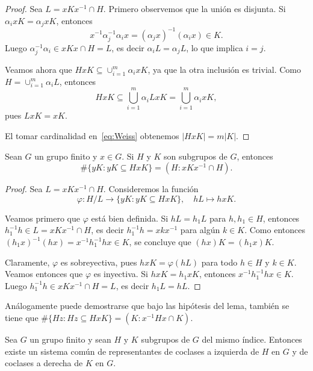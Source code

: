 \begin{proof}
    Sea $L=xKx^{-1}\cap H$. 
    Primero observemos que la unión es disjunta. Si $\alpha_ixK=\alpha_jxK$, entonces 
    \[
    x^{-1}\alpha_j^{-1}\alpha_ix=(\alpha_jx)^{-1}(\alpha_ix)\in K.
    \]
    Luego $\alpha_j^{-1}\alpha_i\in xKx\cap H=L$, es decir $\alpha_iL=\alpha_jL$, lo que implica $i=j$. 
    
    Veamos ahora
    que $HxK\subseteq\cup_{i=1}^m\alpha_ixK$, ya que la otra inclusión es trivial. 
    Como $H=\cup_{i=1}^m\alpha_iL$, entonces 
    \[
    HxK\subseteq\bigcup_{i=1}^m\alpha_iLxK=\bigcup_{i=1}^m\alpha_ixK,
    \]
    pues $LxK=xK$. 
    
    El tomar cardinalidad en~\eqref{eq:Weiss} obtenemos $|HxK|=m|K|$. 
\end{proof}

\begin{lemma}
Sean $G$ un grupo finito y $x\in G$. Si $H$ y $K$ son subgrupos de $G$, entonces
\[
\#\{yK:yK\subseteq HxK\}=(H:xKx^{-1}\cap H).
\]
\end{lemma}

\begin{proof}
    Sea $L=xKx^{-1}\cap H$. Consideremos la función 
    \[
    \varphi\colon H/L\to\{yK:yK\subseteq HxK\},
    \quad 
    hL\mapsto hxK.
    \]
    
    Veamos primero que $\varphi$ está bien definida. Si $hL=h_1L$ para $h,h_1\in H$, entonces
    $h_1^{-1}h\in L=xKx^{-1}\cap H$, es decir $h_1^{-1}h=xkx^{-1}$ para algún $k\in K$. Como entonces $(h_1x)^{-1}(hx)=x^{-1}h_1^{-1}hx\in K$, se concluye que
    $(hx)K=(h_1x)K$. 
    
    Claramente, $\varphi$ es sobreyectiva, pues $hxK=\varphi(hL)$ para todo $h\in H$ y $k\in K$. 
    Veamos entonces que $\varphi$ es inyectiva. Si $hxK=h_1xK$, entonces $x^{-1}h_1^{-1}hx\in K$. Luego
    $h_1^{-1}h\in xKx^{-1}\cap H=L$, es decir $h_1L=hL$. 
\end{proof}

Análogamente puede demostrarse que bajo las hipótesis del lema, también se tiene que 
$\#\{Hz:Hz\subseteq HxK\}=(K:x^{-1}Hx\cap K)$.

\begin{theorem}[Weiss]
Sea $G$ un grupo finito y sean $H$ y $K$ subgrupos de $G$ del mismo índice. Entonces
existe un sistema común de representantes de coclases a izquierda de $H$ en $G$ y 
de coclases a derecha de $K$ en $G$. 
\end{theorem}

